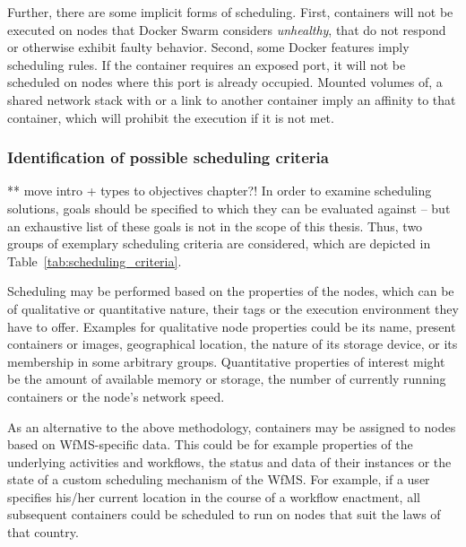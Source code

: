    Further, there are some implicit forms of scheduling. First, containers will not be executed on nodes that Docker Swarm considers \emph{unhealthy}, \ie that do not respond or otherwise exhibit faulty behavior. Second, some Docker features imply scheduling rules. If the container requires an exposed port, it will not be scheduled on nodes where this port is already occupied. Mounted volumes of, a shared network stack with or a link to another container imply an affinity to that container, which will prohibit the execution if it is not met.

  \subsubsection{Identification of possible scheduling criteria} %
  \label{ssub:identification_of_desired_scheduling_criteria}

    ** move intro + types to objectives chapter?!
    In order to examine scheduling solutions, goals should be specified to which they can be evaluated against -- but an exhaustive list of these goals is not in the scope of this thesis. Thus, two groups of exemplary scheduling criteria are considered, which are depicted in Table~\ref{tab:scheduling_criteria}.

    Scheduling may be performed based on the properties of the nodes, which can be of qualitative or quantitative nature, their tags or the execution environment they have to offer. Examples for qualitative node properties could be its name, present containers or images, geographical location, the nature of its storage device, or its membership in some arbitrary groups. Quantitative properties of interest might be the amount of available memory or storage, the number of currently running containers or the node's network speed.

    As an alternative to the above methodology, containers may be assigned to nodes based on \ac{WfMS}-specific data. This could be for example properties of the underlying activities and workflows, the status and data of their instances or the state of a custom scheduling mechanism of the \ac{WfMS}. For example, if a user specifies his/her current location in the course of a workflow enactment, all subsequent containers could be scheduled to run on nodes that suit the laws of that country.

